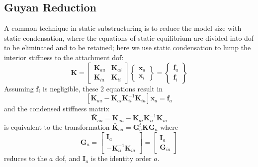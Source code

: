 \documentclass[11pt,openany,twoside]{book}
\numberwithin{equation}{section}		%
\newcommand{\Matrix}[1]{\boldsymbol{#1}}
\newcommand{\Vector}[1]{\boldsymbol{#1}}
\begin{document}
\subsection{\label{sect:guyan-red}Guyan Reduction}
A common technique in static substructuring is to reduce the
model size with static condensation, where the equations of
static equilibrium are divided into dof to be eliminated and to be
retained; here we use static condensation to lump the interior stiffness 
to the attachment dof:
\begin{equation}
\Matrix{K} = \left[
\begin{array}{cc}
   \Matrix{K}_{aa} & \Matrix{K}_{ai} \\
   \Matrix{K}_{ia} & \Matrix{K}_{ii}
\end{array}
\right]
\left\{
\begin{array}{c}
   \Vector{x}_a \\
   \Vector{x}_i
\end{array}
\right\} =
\left\{
\begin{array}{c}
   \Vector{f}_a \\
   \Vector{f}_i
\end{array}
\right\}		\nonumber
\end{equation}
Assuming $\Vector{f}_i$ is negligible, these 2 equations result in
\begin{equation}\label{eqn:static-cond}
\left[\Matrix{K}_{aa}
	- \Matrix{K}_{ai}\Matrix{K}_{ii}^{-1}\Matrix{K}_{ia}\right]
		\Vector{x}_a = \Vector{f}_a
\end{equation}
and the condensed stiffness matrix
\begin{equation}\label{eqn:condensedK}
\Matrix{\bar{K}}_{aa} = 
	\Matrix{K}_{aa} - \Matrix{K}_{ai}\Matrix{K}_{ii}^{-1}\Matrix{K}_{ia}
\end{equation}
is equivalent to the transformation
$\Matrix{\bar{K}}_{aa} = \Matrix{G}_a^t\Matrix{K}\Matrix{G}_a$
where
\begin{equation} \label{eqn:static-ss}
\Matrix{G}_a = \left[
	\begin{array}{c}
		\Matrix{I}_a \\
		-\Matrix{K}_{ii}^{-1}\Matrix{K}_{ia}
	\end{array} \right] =
	\left[\begin{array}{c}
		\Matrix{I}_a \\
		\Matrix{G}_{ia}
	\end{array} \right]
\end{equation}
reduces to the $a$ dof, and $\Matrix{I}_a$ is the identity order $a$.
\end{document}

